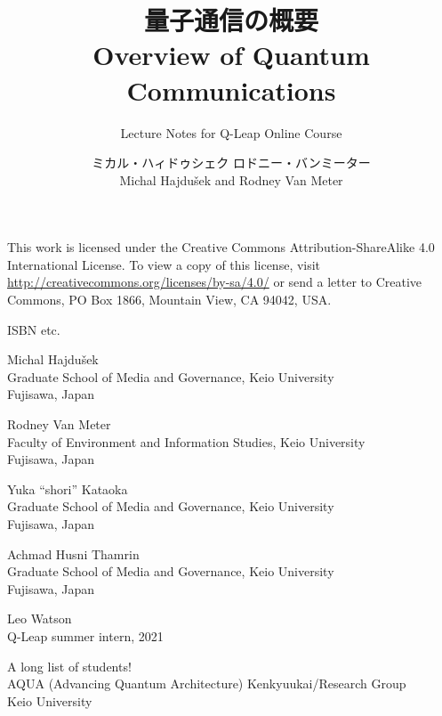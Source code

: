 \documentclass[6x9, dvipdfmx]{newmath}
\title{量子通信の概要\\
Overview of Quantum Communications}
\subtitle{Lecture Notes for Q-Leap Online Course}
\author{ミカル・ハィドゥシェク ロドニー・バンミーター\\
Michal Hajdu\v{s}ek and Rodney Van Meter
}
\begin{document}
\halftitlepage


\titlepage

\begin{copyrightpage}
This work is licensed under the Creative Commons Attribution-ShareAlike 4.0 International License. To view a copy of this license, visit \url{http://creativecommons.org/licenses/by-sa/4.0/} or send a letter to Creative Commons, PO Box 1866, Mountain View, CA 94042, USA.

ISBN etc.
\end{copyrightpage}

\dedication{To our families and our students, past, present and future\\ ---rdv and mh} 



\tableofcontents
\listoffigures

\begin{contributors}[twocolumn]

\contrib 
Michal Hajdu\v{s}ek\\
Graduate School of Media and Governance, Keio University\\
Fujisawa, Japan

\contrib 
Rodney Van Meter\\
Faculty of Environment and Information Studies, Keio University\\
Fujisawa, Japan

\contrib
Yuka ``shori'' Kataoka\\
Graduate School of Media and Governance, Keio University\\
Fujisawa, Japan

\contrib
Achmad Husni Thamrin\\
Graduate School of Media and Governance, Keio University\\
Fujisawa, Japan

\contrib
Leo Watson\\
Q-Leap summer intern, 2021

\contrib 
A long list of students!\\
AQUA (Advancing Quantum Architecture) Kenkyuukai/Research Group\\
Keio University
\end{contributors}
\end{document}
